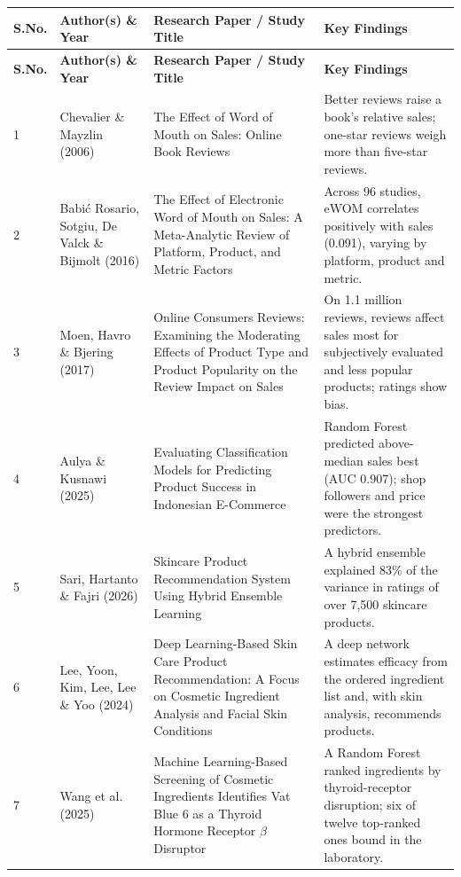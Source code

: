 \documentclass[11pt,a4paper]{article}
\begin{document}
\begingroup\footnotesize
\setlength{\tabcolsep}{4pt}
\begin{longtable}{|p{0.55cm}|p{3.0cm}|p{5.9cm}|p{6.5cm}|}
\hline
\rowcolor{headfill}\textbf{S.No.} & \textbf{Author(s) \& Year} & \textbf{Research Paper / Study Title} & \textbf{Key Findings} \\
\hline
\endfirsthead
\hline
\rowcolor{headfill}\textbf{S.No.} & \textbf{Author(s) \& Year} & \textbf{Research Paper / Study Title} & \textbf{Key Findings} \\
\hline
\endhead
1 & Chevalier \& Mayzlin (2006) & The Effect of Word of Mouth on Sales: Online Book Reviews & Better reviews raise a book's relative sales; one-star reviews weigh more than five-star reviews. \\ \hline
2 & Babi\'{c} Rosario, Sotgiu, De Valck \& Bijmolt (2016) & The Effect of Electronic Word of Mouth on Sales: A Meta-Analytic Review of Platform, Product, and Metric Factors & Across 96 studies, eWOM correlates positively with sales (0.091), varying by platform, product and metric. \\ \hline
3 & Moen, Havro \& Bjering (2017) & Online Consumers Reviews: Examining the Moderating Effects of Product Type and Product Popularity on the Review Impact on Sales & On 1.1 million reviews, reviews affect sales most for subjectively evaluated and less popular products; ratings show bias. \\ \hline
4 & Aulya \& Kusnawi (2025) & Evaluating Classification Models for Predicting Product Success in Indonesian E-Commerce & Random Forest predicted above-median sales best (AUC 0.907); shop followers and price were the strongest predictors. \\ \hline
5 & Sari, Hartanto \& Fajri (2026) & Skincare Product Recommendation System Using Hybrid Ensemble Learning & A hybrid ensemble explained 83\% of the variance in ratings of over 7,500 skincare products. \\ \hline
6 & Lee, Yoon, Kim, Lee, Lee \& Yoo (2024) & Deep Learning-Based Skin Care Product Recommendation: A Focus on Cosmetic Ingredient Analysis and Facial Skin Conditions & A deep network estimates efficacy from the ordered ingredient list and, with skin analysis, recommends products. \\ \hline
7 & Wang et al. (2025) & Machine Learning-Based Screening of Cosmetic Ingredients Identifies Vat Blue 6 as a Thyroid Hormone Receptor $\beta$ Disruptor & A Random Forest ranked ingredients by thyroid-receptor disruption; six of twelve top-ranked ones bound in the laboratory. \\ \hline

\end{longtable}
\end{document}
